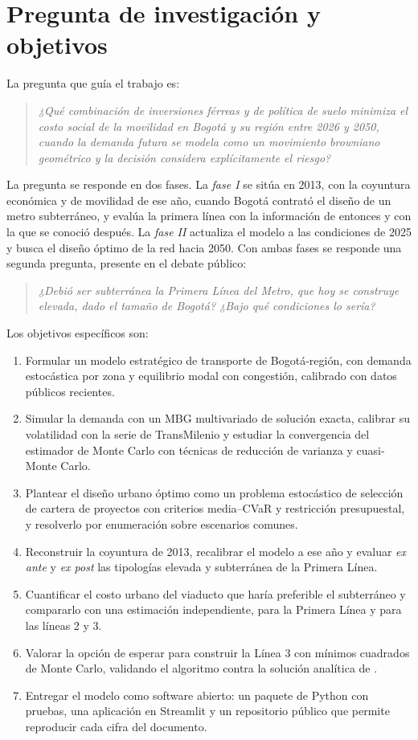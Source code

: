 \section{Pregunta de investigación y objetivos}

La pregunta que guía el trabajo es:
\begin{quote}\itshape
¿Qué combinación de inversiones férreas y de política de suelo minimiza el costo social de la
movilidad en Bogotá y su región entre 2026 y 2050, cuando la demanda futura se modela como un
movimiento browniano geométrico y la decisión considera explícitamente el riesgo?
\end{quote}

La pregunta se responde en dos fases. La \emph{fase I} se sitúa en 2013, con la coyuntura económica y
de movilidad de ese año, cuando Bogotá contrató el diseño de un metro subterráneo, y evalúa la primera
línea con la información de entonces y con la que se conoció después. La \emph{fase II} actualiza el
modelo a las condiciones de 2025 y busca el diseño óptimo de la red hacia 2050. Con ambas fases se
responde una segunda pregunta, presente en el debate público:
\begin{quote}\itshape
¿Debió ser subterránea la Primera Línea del Metro, que hoy se construye elevada, dado el tamaño de
Bogotá? ¿Bajo qué condiciones lo sería?
\end{quote}

Los objetivos específicos son:
\begin{enumerate}[nosep]
  \item Formular un modelo estratégico de transporte de Bogotá-región, con demanda estocástica por zona
        y equilibrio modal con congestión, calibrado con datos públicos recientes.
  \item Simular la demanda con un MBG multivariado de solución exacta, calibrar su volatilidad con la
        serie de TransMilenio y estudiar la convergencia del estimador de Monte Carlo con técnicas de
        reducción de varianza y cuasi-Monte Carlo.
  \item Plantear el diseño urbano óptimo como un problema estocástico de selección de cartera de
        proyectos con criterios media--CVaR y restricción presupuestal, y resolverlo por enumeración
        sobre escenarios comunes.
  \item Reconstruir la coyuntura de 2013, recalibrar el modelo a ese año y evaluar \emph{ex ante} y
        \emph{ex post} las tipologías elevada y subterránea de la Primera Línea.
  \item Cuantificar el costo urbano del viaducto que haría preferible el subterráneo y compararlo con
        una estimación independiente, para la Primera Línea y para las líneas 2 y 3.
  \item Valorar la opción de esperar para construir la Línea 3 con mínimos cuadrados de Monte Carlo,
        validando el algoritmo contra la solución analítica de \citet{mcdonald1986}.
  \item Entregar el modelo como software abierto: un paquete de Python con pruebas, una aplicación en
        Streamlit y un repositorio público que permite reproducir cada cifra del documento.
\end{enumerate}

